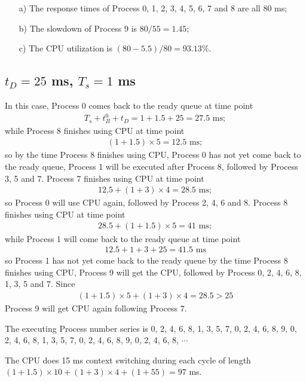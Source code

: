 \documentclass[12pt,letterpaper]{article}
\begin{document}
\begin{enumerate}
\item[a)] The response times of Process 0, 1, 2, 3, 4, 5, 6, 7 and 8 are all 80 ms;
\item[b)] The slowdown of Process 9 is $80/55=1.45$;
\item[c)] The CPU utilization is $(80-5.5)/80=93.13\%$.
\end{enumerate}

\subsection{$t_D=25$ ms, $T_s = 1$ ms}
In this case, Process 0 comes back to the ready queue at time point
\begin{eqnarray}
T_s+t_B^0+t_D=1+1.5+25=27.5\textrm{ ms};
\end{eqnarray}
while Process 8 finishes using CPU at time point 
\begin{eqnarray}
(1+1.5)\times5=12.5\textrm{ ms};
\end{eqnarray}
so by the time Process 8 finishes using CPU, Process 0 has not yet come back to the ready queue, Process 1 will be executed after Process 8, followed by Process 3, 5 and 7. Process 7 finishes using CPU at time point
\begin{eqnarray}
12.5+(1+3)\times4=28.5\textrm{ ms};
\end{eqnarray}
so Process 0 will use CPU again, followed by Process 2, 4, 6 and 8. Process 8 finishes using CPU at time point
\begin{eqnarray}
28.5+(1+1.5)\times5=41\textrm{ ms};
\end{eqnarray}
while Process 1 will come back to the ready queue at time point
\begin{eqnarray}
12.5+1+3+25=41.5\textrm{ ms}
\end{eqnarray}
so Process 1 has not yet come back to the ready queue by the time Process 8 finishes using CPU, Process 9 will get the CPU, followed by Process 0, 2, 4, 6, 8, 1, 3, 5 and 7. Since
\begin{eqnarray}
(1+1.5)\times5+(1+3)\times4=28.5>25
\end{eqnarray}
Process 9 will get CPU again following Process 7.

The executing Process number series is 0, 2, 4, 6, 8, 1, 3, 5, 7, 0, 2, 4, 6, 8, 9, 0, 2, 4, 6, 8, 1, 3, 5, 7, 0, 2, 4, 6, 8, 9, 0, 2, 4, 6, 8, $\cdots$

The CPU does 15 ms context switching during each cycle of length $(1+1.5)\times10+(1+3)\times4+(1+55)=97$ ms.
\end{document}
